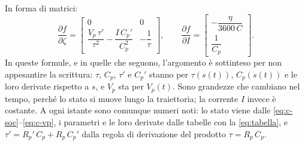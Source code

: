 \documentclass[11pt,a4paper]{article}
\begin{document}
In forma di matrici:
\[
  \frac{\partial f}{\partial \zeta} =
  \begin{bmatrix}
    0 & 0 \\[4pt]
    \dfrac{V_p\,\tau'}{\tau^2} - \dfrac{I\,C_p'}{C_p^2} & -\dfrac{1}{\tau}
  \end{bmatrix},
  \qquad
  \frac{\partial f}{\partial I} =
  \begin{bmatrix}
    -\dfrac{\eta}{3600\,C} \\[8pt] \dfrac{1}{C_p}
  \end{bmatrix}.
\]
In queste formule, e in quelle che seguono, l'argomento è sottinteso per non
appesantire la scrittura: $\tau$, $C_p$, $\tau'$ e $C_p'$ stanno per
$\tau(s(t))$, $C_p(s(t))$ e le loro derivate rispetto a $s$, e $V_p$ sta per
$V_p(t)$. Sono grandezze che cambiano nel tempo, perché lo stato si muove lungo
la traiettoria; la corrente $I$ invece è costante. A ogni istante sono comunque
numeri noti: lo stato viene dalle \eqref{eq:c-soc}--\eqref{eq:c-vp}, i
parametri e le loro derivate dalle tabelle con la \eqref{eq:tabella}, e
$\tau' = R_p'\,C_p + R_p\,C_p'$ dalla regola di derivazione del prodotto
$\tau = R_p\,C_p$.
\end{document}
